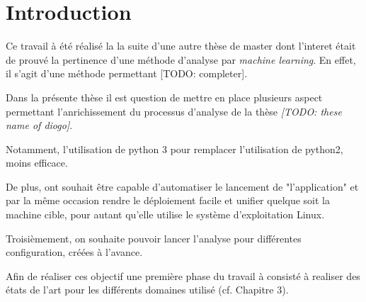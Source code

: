 \chapter{Introduction}

Ce travail à été réalisé la la suite d'une autre thèse de master dont l'interet était de prouvé la pertinence d'une méthode d'analyse par \emph{machine learning}. En effet, il s'agit d'une méthode permettant [TODO: completer].

Dans la présente thèse il est question de mettre en place plusieurs aspect permettant l'anrichissement du processus d'analyse de la thèse \emph{[TODO: these name of diogo]}. 

Notamment, l'utilisation de python 3 pour remplacer l'utilisation de python2, moins efficace. %

De plus, ont souhait être capable d'automatiser le lancement de "l'application" et par la même occasion rendre le déploiement facile et unifier quelque soit la machine cible, pour autant qu'elle utilise le système d'exploitation Linux.

Troisièmement, on souhaite pouvoir lancer l'analyse pour différentes configuration, créées à l'avance.

Afin de réaliser ces objectif une première phase du travail à consisté à realiser des états de l'art pour les différents domaines utilisé (cf. Chapitre 3). %

